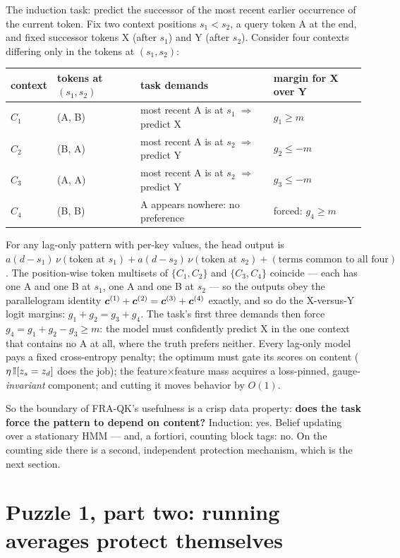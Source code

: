 \documentclass{article}
\begin{document}
The induction task: predict the successor of the most recent earlier occurrence of the current token. Fix two context positions $s_1 < s_2$, a query token A at the end, and fixed successor tokens X (after $s_1$) and Y (after $s_2$). Consider four contexts differing only in the tokens at $(s_1, s_2)$:
\begin{center}
\begin{tabular}{llll}
\toprule
context & tokens at $(s_1, s_2)$ & task demands & margin for X over Y \\
\midrule
$C_1$ & (A,\; B) & most recent A is at $s_1$ $\Rightarrow$ predict X & $g_1 \ge m$ \\
$C_2$ & (B,\; A) & most recent A is at $s_2$ $\Rightarrow$ predict Y & $g_2 \le -m$ \\
$C_3$ & (A,\; A) & most recent A is at $s_2$ $\Rightarrow$ predict Y & $g_3 \le -m$ \\
$C_4$ & (B,\; B) & A appears nowhere: no preference & forced: $g_4 \ge m$ \\
\bottomrule
\end{tabular}
\end{center}
For any lag-only pattern with per-key values, the head output is $a(d - s_1)\,\nu(\text{token at } s_1) + a(d - s_2)\,\nu(\text{token at } s_2) + (\text{terms common to all four})$. The position-wise token multisets of $\{C_1, C_2\}$ and $\{C_3, C_4\}$ coincide --- each has one A and one B at $s_1$, one A and one B at $s_2$ --- so the outputs obey the parallelogram identity $\boldsymbol{c}^{(1)} + \boldsymbol{c}^{(2)} = \boldsymbol{c}^{(3)} + \boldsymbol{c}^{(4)}$ exactly, and so do the X-versus-Y logit margins: $g_1 + g_2 = g_3 + g_4$. The task's first three demands then force $g_4 = g_1 + g_2 - g_3 \ge m$: the model must confidently predict X in the one context that contains no A at all, where the truth prefers neither. Every lag-only model pays a fixed cross-entropy penalty; the optimum must gate its scores on content ($\eta\,\mathbb{I}[z_s = z_d]$ does the job); the feature$\times$feature mass acquires a loss-pinned, gauge-\emph{invariant} component; and cutting it moves behavior by $O(1)$.

So the boundary of FRA-QK's usefulness is a crisp data property: \textbf{does the task force the pattern to depend on content?} Induction: yes. Belief updating over a stationary HMM --- and, a fortiori, counting block tags: no. On the counting side there is a second, independent protection mechanism, which is the next section.

\section{Puzzle 1, part two: running averages protect themselves}\label{sec:protection}
\end{document}
